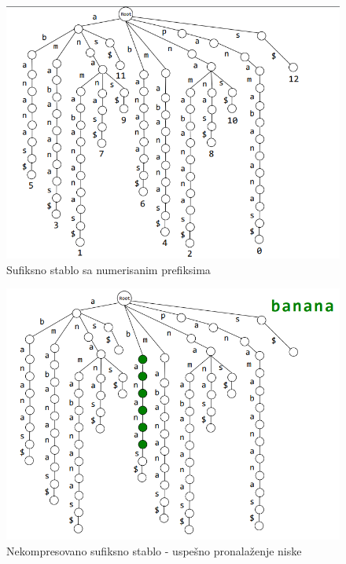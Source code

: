 \begin{minipage}{\textwidth}
\begin{minipage}{0.5\textwidth}
\begin{figure}[H]
			\includegraphics[width=\textwidth]{poglavlja/9/slike/sufiksnoStabloNumerisaniPrefiksi.png}
			\caption{Sufiksno stablo sa numerisanim prefiksima}
			\label{nssNum}
		\end{figure}  
	\end{minipage}
	\vspace*{1em}
\end{minipage}

\iffalse 
\begin{figure}[h!]
\centering
\includegraphics[scale=0.5]{poglavlja/9/slike/sufiksnoStabloNekompresovanoPogodak.png}
\caption{Nekompresovano sufiksno stablo - uspešno pronalaženje niske}
\label{slika:X}
\end{figure}

